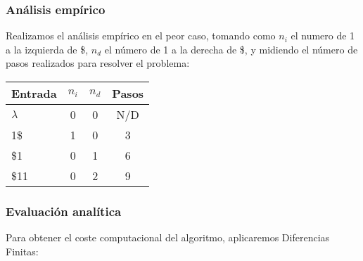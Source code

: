 \subsubsection*{Análisis empírico}

Realizamos el análisis empírico en el peor caso, tomando como $n_i$ el numero de 1 a la izquierda de \$, $n_d$ el número de 1 a la derecha de \$, y midiendo el número de pasos realizados para resolver el problema:

\begin{table}[h]
    \centering
    \begin{tabular}{lccc}
        Entrada & $n_i$ & $n_d$ & Pasos \\
        \hline
        $\lambda$      & 0  & 0  & N/D  \\
        1\$            & 1  & 0  & 3    \\
        \$1            & 0  & 1  & 6    \\
        \$11           & 0  & 2  & 9    \\
        
    \end{tabular}
\end{table}


\subsubsection*{Evaluación analítica}
Para obtener el coste computacional del algoritmo, aplicaremos Diferencias Finitas:




